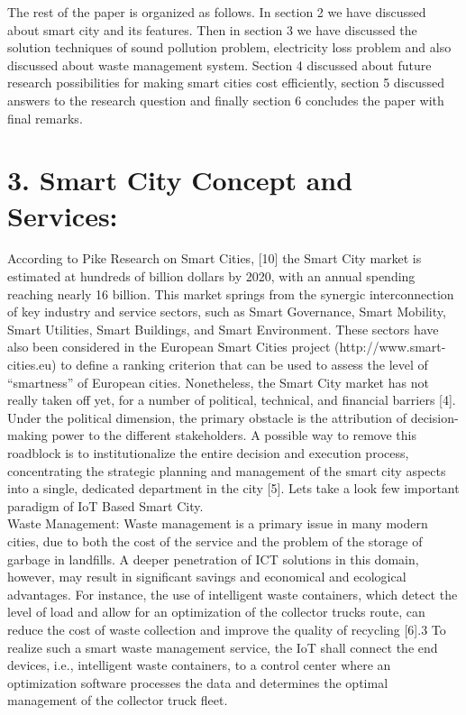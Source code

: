 \documentclass[a4paper]{report}
\begin{document}
	The rest of the paper is organized as follows. In section 2 we have discussed about smart city and its features. Then in section 3 we have discussed the solution techniques of sound pollution problem, electricity loss problem and also discussed about waste management system. Section 4 discussed about future research possibilities for making smart cities cost efficiently, section 5 discussed answers to the research question and finally section 6 concludes the paper with final remarks. 
	\section*{3. Smart City Concept and Services:}
	According to Pike Research on Smart Cities, [10] the Smart City
	market is estimated at hundreds of billion dollars by 2020, with
	an annual spending reaching nearly 16 billion. This market
	springs from the synergic interconnection of key industry and service sectors, such as Smart Governance, Smart Mobility,
	Smart Utilities, Smart Buildings, and Smart Environment. These
	sectors have also been considered in the European Smart Cities
	project (http://www.smart-cities.eu) to define a ranking criterion
	that can be used to assess the level of “smartness” of European
	cities. Nonetheless, the Smart City market has not really taken off yet, for a number of political, technical, and financial barriers [4]. Under the political dimension, the primary obstacle is the
	attribution of decision-making power to the different stakeholders. A possible way to remove this roadblock is to institutionalize the entire decision and execution process, concentrating the strategic planning and management of the smart city aspects into a single, dedicated department in the city [5]. Lets take a look few important paradigm of IoT Based Smart City.\\
	Waste Management: Waste management is a primary issue in
	many modern cities, due to both the cost of the service and the
	problem of the storage of garbage in landfills. A deeper penetration of ICT solutions in this domain, however, may result in
	significant savings and economical and ecological advantages.
	For instance, the use of intelligent waste containers, which detect
	the level of load and allow for an optimization of the collector
	trucks route, can reduce the cost of waste collection and improve
	the quality of recycling [6].3 To realize such a smart waste
	management service, the IoT shall connect the end devices, i.e.,
	intelligent waste containers, to a control center where an optimization software processes the data and determines the optimal management of the collector truck fleet. \\
\end{document}

